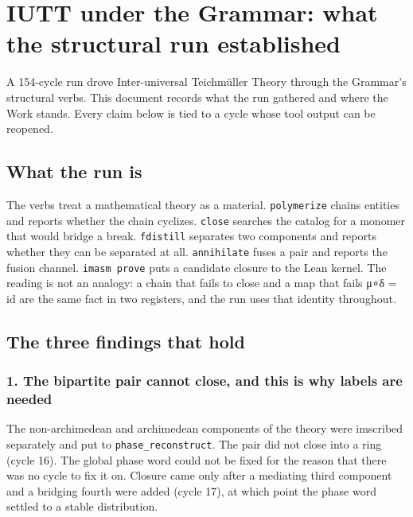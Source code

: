 \hypertarget{iutt-under-the-grammar-what-the-structural-run-established}{%
\section{IUTT under the Grammar: what the structural run
established}\label{iutt-under-the-grammar-what-the-structural-run-established}}

A 154-cycle run drove Inter-universal Teichmüller Theory through the
Grammar's structural verbs. This document records what the run gathered
and where the Work stands. Every claim below is tied to a cycle whose
tool output can be reopened.

\hypertarget{what-the-run-is}{%
\subsection{What the run is}\label{what-the-run-is}}

The verbs treat a mathematical theory as a material. \texttt{polymerize}
chains entities and reports whether the chain cyclizes. \texttt{close}
searches the catalog for a monomer that would bridge a break.
\texttt{fdistill} separates two components and reports whether they can
be separated at all. \texttt{annihilate} fuses a pair and reports the
fusion channel. \texttt{imasm\ prove} puts a candidate closure to the
Lean kernel. The reading is not an analogy: a chain that fails to close
and a map that fails μ∘δ = id are the same fact in two
registers, and the run uses that identity throughout.

\hypertarget{the-three-findings-that-hold}{%
\subsection{The three findings that
hold}\label{the-three-findings-that-hold}}

\hypertarget{the-bipartite-pair-cannot-close-and-this-is-why-labels-are-needed}{%
\subsubsection{1. The bipartite pair cannot close, and this is why
labels are
needed}\label{the-bipartite-pair-cannot-close-and-this-is-why-labels-are-needed}}

The non-archimedean and archimedean components of the theory were
imscribed separately and put to \texttt{phase\_reconstruct}. The pair
did not close into a ring (cycle 16). The global phase word could not be
fixed for the reason that there was no cycle to fix it on. Closure came
only after a mediating third component and a bridging fourth were added
(cycle 17), at which point the phase word settled to a stable
distribution.

